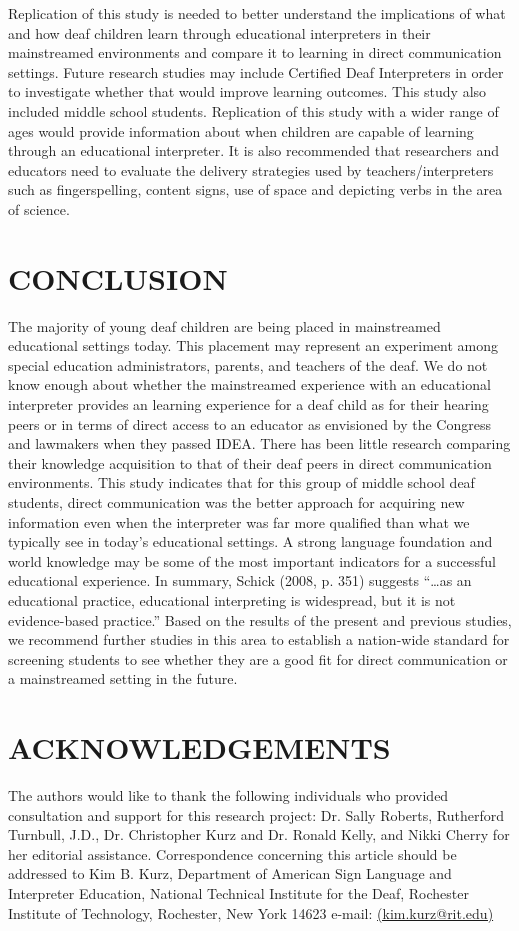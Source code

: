 \documentclass[11.5pt]{sig-alternate} %
\begin{document}
\begin{large}
Replication of this study is needed to better understand the implications of what and how deaf children learn through educational interpreters in their mainstreamed environments and compare it to learning in direct communication settings. Future research studies may include Certified Deaf Interpreters in order to investigate whether that would improve learning outcomes. This study also included middle school students. Replication of this study with a wider range of ages would provide information about when children are capable of learning through an educational interpreter. It is also recommended that researchers and educators need to evaluate the delivery strategies used by teachers/interpreters such as fingerspelling, content signs, use of space and depicting verbs in the area of science.

\section*{CONCLUSION}

The majority of young deaf children are being placed in mainstreamed educational settings today. This placement may represent an experiment among special education administrators, parents, and teachers of the deaf. We do not know enough about whether the mainstreamed experience with an educational interpreter provides an learning experience for a deaf child as for their hearing peers or in terms of direct access to an educator as envisioned by the Congress and lawmakers when they passed IDEA. There has been little research comparing their knowledge acquisition to that of their deaf peers in direct communication environments. This study indicates that for this group of middle school deaf students, direct communication was the better approach for acquiring new information even when the interpreter was far more qualified than what we typically see in today’s educational settings. A strong language foundation and world knowledge may be some of the most important indicators for a successful educational experience. In summary, Schick (2008, p. 351) suggests “…as an educational practice, educational interpreting is widespread, but it is not evidence-based practice.” Based on the results of the present and previous studies, we recommend further studies in this area to establish a nation-wide standard for screening students to see whether they are a good fit for direct communication or a mainstreamed setting in the future. 


\section*{ACKNOWLEDGEMENTS}
The authors would like to thank the following individuals who provided consultation and support for this research project: Dr. Sally Roberts, Rutherford Turnbull, J.D., Dr. Christopher Kurz and Dr. Ronald Kelly, and Nikki Cherry for her editorial assistance. Correspondence concerning this article should be addressed to Kim B. Kurz, Department of American Sign Language and Interpreter Education, National Technical Institute for the Deaf, Rochester Institute of Technology, Rochester, New York 14623 e-mail: \href{mailto:  kim.kurz@rit.edu}{(kim.kurz@rit.edu)}


\end{large}
\end{document}
